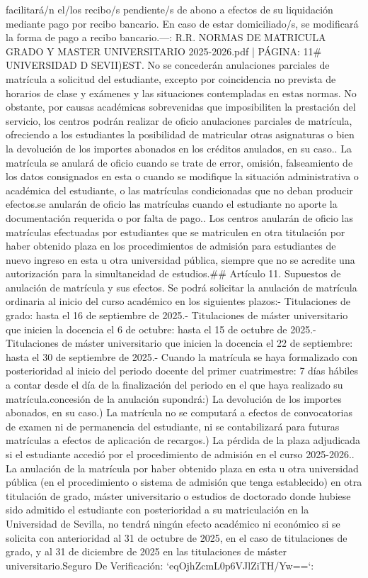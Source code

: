 \documentclass{article}
\begin{document}
\begin{itemize}
{facilitará/n el/los recibo/s pendiente/s de abono a efectos de su liquidación mediante pago por recibo bancario. En caso de estar domiciliado/s, se modificará la forma de pago a recibo bancario.\n\n---\n\nFUENTE: R.R. NORMAS DE MATRICULA GRADO Y MASTER UNIVERSITARIO 2025-2026.pdf | PÁGINA: 11\n# UNIVERSIDAD D SEVII\n\nC)EST\n{}. No se concederán anulaciones parciales de matrícula a solicitud del estudiante, excepto por coincidencia no prevista de horarios de clase y exámenes y las situaciones contempladas en estas normas. No obstante, por causas académicas sobrevenidas que imposibiliten la prestación del servicio, los centros podrán realizar de oficio anulaciones parciales de matrícula, ofreciendo a los estudiantes la posibilidad de matricular otras asignaturas o bien la devolución de los importes abonados en los créditos anulados, en su caso.\n{}. La matrícula se anulará de oficio cuando se trate de error, omisión, falseamiento de los datos consignados en esta o cuando se modifique la situación administrativa o académica del estudiante, o las matrículas condicionadas que no deban producir efectos.\n\nAsimismo se anularán de oficio las matrículas cuando el estudiante no aporte la documentación requerida o por falta de pago.\n{}. Los centros anularán de oficio las matrículas efectuadas por estudiantes que se matriculen en otra titulación por haber obtenido plaza en los procedimientos de admisión para estudiantes de nuevo ingreso en esta u otra universidad pública, siempre que no se acredite una autorización para la simultaneidad de estudios.\n\n## Artículo 11. Supuestos de anulación de matrícula y sus efectos\n{}. Se podrá solicitar la anulación de matrícula ordinaria al inicio del curso académico en los siguientes plazos:\n\n- Titulaciones de grado: hasta el 16 de septiembre de 2025.\n- Titulaciones de máster universitario que inicien la docencia el 6 de octubre: hasta el 15 de octubre de 2025.\n- Titulaciones de máster universitario que inicien la docencia el 22 de septiembre: hasta el 30 de septiembre de 2025.\n- Cuando la matrícula se haya formalizado con posterioridad al inicio del periodo docente del primer cuatrimestre: 7 días hábiles a contar desde el día de la finalización del periodo en el que haya realizado su matrícula.\n\nLa concesión de la anulación supondrá:\n\na) La devolución de los importes abonados, en su caso.\n\nb) La matrícula no se computará a efectos de convocatorias de examen ni de permanencia del estudiante, ni se contabilizará para futuras matrículas a efectos de aplicación de recargos.\n\nc) La pérdida de la plaza adjudicada si el estudiante accedió por el procedimiento de admisión en el curso 2025-2026.\n{}. La anulación de la matrícula por haber obtenido plaza en esta u otra universidad pública (en el procedimiento o sistema de admisión que tenga establecido) en otra titulación de grado, máster universitario o estudios de doctorado donde hubiese sido admitido el estudiante con posterioridad a su matriculación en la Universidad de Sevilla, no tendrá ningún efecto académico ni económico si se solicita con anterioridad al 31 de octubre de 2025, en el caso de titulaciones de grado, y al 31 de diciembre de 2025 en las titulaciones de máster universitario.\n{} Seguro De Verificación: `eqOjhZcmL0p6VJlZiTH/Yw==`\nFecha: }
\end{itemize}
\end{document}
